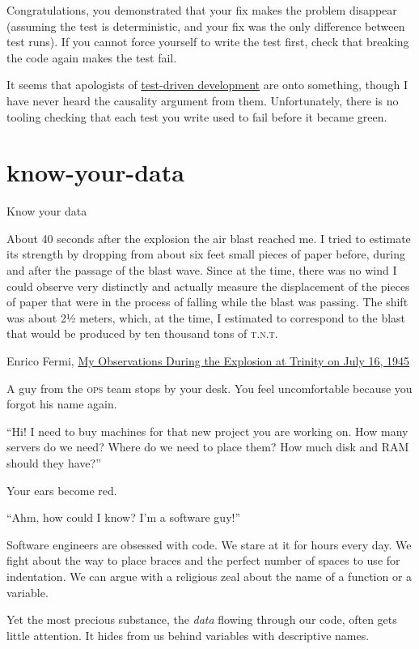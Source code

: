 \documentclass{article}
\begin{document}
Congratulations, you demonstrated that your fix makes the problem disappear (assuming the test is deterministic, and your fix was the only difference between test runs).
If you cannot force yourself to write the test first, check that breaking the code again makes the test fail.

It seems that apologists of \href{https://en.wikipedia.org/wiki/Test-driven_development}{test-driven development} are onto something, though I have never heard the causality argument from them.
Unfortunately, there is no tooling checking that each test you write used to fail before it became green.

\section{know-your-data}{Know your data}
\epigraph{
  About 40 seconds after the explosion the air blast reached me.
  I tried to estimate its strength by dropping from about six feet small pieces of paper before, during and after the passage of the blast wave.
  Since at the time, there was no wind I could observe very distinctly and actually measure the displacement of the pieces of paper that were in the process of falling while the blast was passing.
  The shift was about 2½ meters, which, at the time, I estimated to correspond to the blast that would be produced by ten thousand tons of \textsc{t.n.t.}
}{Enrico Fermi, \href{https://www.atomicarchive.com/resources/documents/trinity/fermi.html}{My Observations During the Explosion at Trinity on July 16, 1945}}

A guy from the \textsc{ops} team stops by your desk.
You feel uncomfortable because you forgot his name again.

``Hi! I need to buy machines for that new project you are working on.
How many servers do we need?
Where do we need to place them? 
How much disk and RAM should they have?''

Your ears become red.

``Ahm, how could I know? I'm a software guy!''

Software engineers are obsessed with code.
We stare at it for hours every day.
We fight about the way to place braces and the perfect number of spaces to use for indentation.
We can argue with a religious zeal about the name of a function or a variable.

Yet the most precious substance, the \emph{data} flowing through our code, often gets little attention.
It hides from us behind variables with descriptive names.
\end{document}
